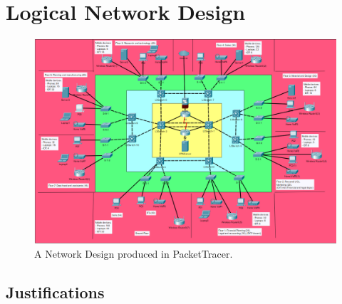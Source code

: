 \chapter{Logical Network Design}

\begin{figure}[ht]
    \includegraphics[width=15cm]{Figures/Network_Diagram.png}
    \caption{A Network Design produced in PacketTracer.}
    \label{fig:Network_Diagram}
\end{figure}

\section{Justifications}